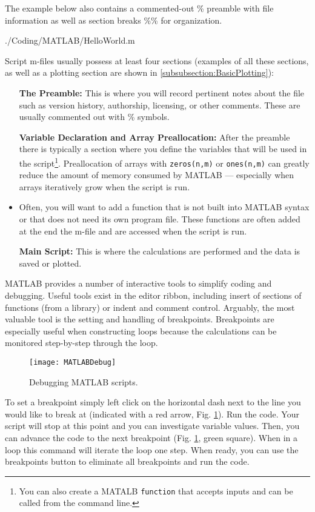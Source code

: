 The example below also contains a commented-out \% preamble with file information as well as section breaks \%\% for organization. 

				
				{./Coding/MATLAB/HelloWorld.m}
				
Script m-files usually possess at least four sections (examples of all these sections, as well as a plotting section are shown in \ref{subsubsection:BasicPlotting}):

\begin{itemize}[align=left]
	\item [\textbf{The Preamble:}] This is where you will record pertinent notes about the file such as version history, authorship, licensing, or other comments. These are usually commented out with \% symbols. 
	\item [\textbf{Variable Declaration and Array Preallocation:}] After the preamble there is typically a section where you define the variables that will be used in the script\footnote{You can also create a MATALB {\lstinline[style=Matlab-editor]!function!} that accepts inputs and can be called from the command line.}. Preallocation of arrays with {\lstinline[style=Matlab-editor]!zeros(n,m)!} or {\lstinline[style=Matlab-editor]!ones(n,m)!} can greatly reduce the amount of memory consumed by MATLAB --- especially when arrays iteratively grow when the script is run.  
		\item [\textbf{Anonymous Function:}] Often, you will want to add a function that is not built into MATLAB syntax or that does not need its own program file. These functions are often added at the end the m-file and are accessed when the script is run.
	\item [\textbf{Main Script:}] This is where the calculations are performed and the data is saved or plotted.
\end{itemize}

MATLAB provides a number of interactive tools to simplify coding and debugging. Useful tools exist in the editor ribbon, including insert of sections of functions (from a library) or indent and comment control. Arguably, the most valuable tool is the setting and handling of breakpoints. Breakpoints are especially useful when constructing loops because the calculations can be monitored step-by-step through the loop.

\begin{figure}[b!]%
	\centering
	\texttt{[image: MATLABDebug]}%
	\caption{Debugging MATLAB scripts.}%
	\label{fig:Breakpoint}%
\end{figure}

To set a breakpoint simply left click on the horizontal dash next to the line you would like to break at (indicated with a red arrow, Fig. \ref{fig:Breakpoint}). Run the code. Your script will stop at this point and you can investigate variable values. Then, you can advance the code to the next breakpoint (Fig. \ref{fig:Breakpoint}, green square). When in a loop this command will iterate the loop one step. When ready, you can use the breakpoints button to eliminate all breakpoints and run the code.



		